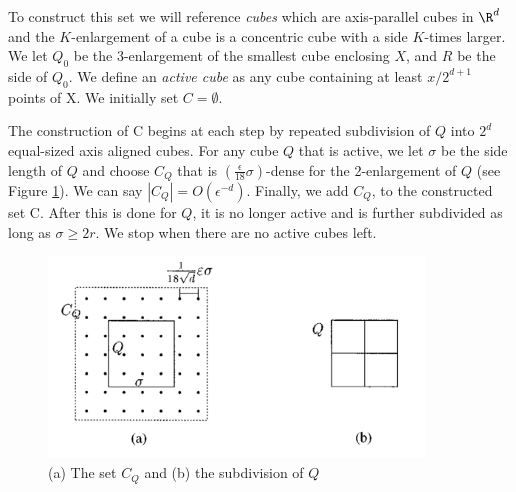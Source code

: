 To construct this set we will reference \emph{cubes} which are axis-parallel cubes in $\R^d$ and the $K$-enlargement of a cube is a concentric cube with a side $K$-times larger. We let $Q_0$ be the 3-enlargement of the smallest cube enclosing $X$, and $R$ be the side of $Q_0$. We define an \emph{active cube} as any cube containing at least $x/2^{d+1}$ points of X. We initially set $C = \emptyset$. 

\noindent The construction of C begins at each step by repeated subdivision of $Q$ into $2^d$ equal-sized axis aligned cubes. For any cube $Q$ that is active, we let $\sigma$ be the side length of $Q$ and choose $C_Q$ that is $(\frac{\epsilon }{18} \sigma)$-dense for the 2-enlargement of $Q$ (see Figure \ref{fig:cq}). We can say $|C_Q| = O(\epsilon^{-d})$. Finally, we add $C_Q$, to the constructed set C.  After this is done for $Q$, it is no longer active and is further subdivided as long as $\sigma \geq 2r$. We stop when there are no active cubes left. 

\begin{figure}
    \centering
    \includegraphics[width=10cm]{chapter_1/files/Cq.png}
\centering
    \caption{(a) The set $C_Q$ and (b) the subdivision of $Q$ \cite{matousek}}
    \label{fig:cq}
\end{figure}


